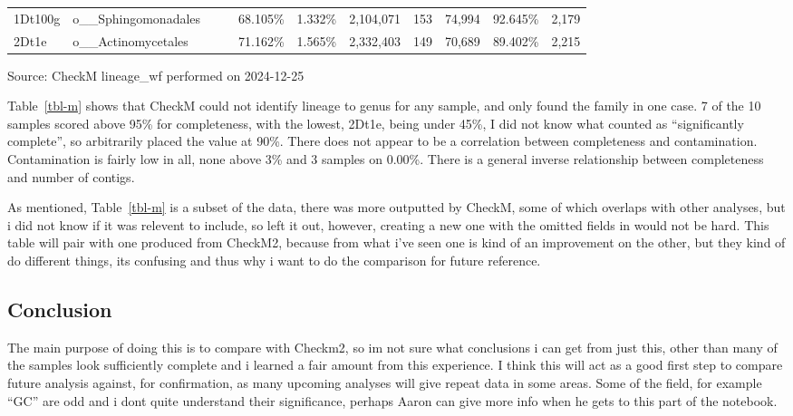 \documentclass[
  letterpaper,
  DIV=11,
  numbers=noendperiod]{scrreprt}
\begin{document}
\begin{table}
{\begin{tabular*}{\linewidth}{@{\extracolsep{\fill}}llrrrrrrrrr}
1Dt100g & o\_\_Sphingomonadales & {\cellcolor[HTML]{808080}{\textcolor[HTML]{FFFFFF}{76.77}}} & {\cellcolor[HTML]{FFF5EB}{\textcolor[HTML]{000000}{0.00}}} & 68.105\% & 1.332\% & 2,104,071 & 153 & 74,994 & 92.645\% & 2,179 \\ 
2Dt1e & o\_\_Actinomycetales & {\cellcolor[HTML]{808080}{\textcolor[HTML]{FFFFFF}{44.74}}} & {\cellcolor[HTML]{FFF5EB}{\textcolor[HTML]{000000}{0.00}}} & 71.162\% & 1.565\% & 2,332,403 & 149 & 70,689 & 89.402\% & 2,215 \\ 
\bottomrule
\end{tabular*}
\begin{minipage}{\linewidth}
Source: CheckM lineage\_wf performed on 2024-12-25\\
\end{minipage}

}

\end{table}%

Table~\ref{tbl-m} shows that CheckM could not identify lineage to genus
for any sample, and only found the family in one case. 7 of the 10
samples scored above 95\% for completeness, with the lowest, 2Dt1e,
being under 45\%, I did not know what counted as ``significantly
complete'', so arbitrarily placed the value at 90\%. There does not
appear to be a correlation between completeness and contamination.
Contamination is fairly low in all, none above 3\% and 3 samples on
0.00\%. There is a general inverse relationship between completeness and
number of contigs.

As mentioned, Table~\ref{tbl-m} is a subset of the data, there was more
outputted by CheckM, some of which overlaps with other analyses, but i
did not know if it was relevent to include, so left it out, however,
creating a new one with the omitted fields in would not be hard. This
table will pair with one produced from CheckM2, because from what i've
seen one is kind of an improvement on the other, but they kind of do
different things, its confusing and thus why i want to do the comparison
for future reference.

\subsection{Conclusion}\label{conclusion}

The main purpose of doing this is to compare with Checkm2, so im not
sure what conclusions i can get from just this, other than many of the
samples look sufficiently complete and i learned a fair amount from this
experience. I think this will act as a good first step to compare future
analysis against, for confirmation, as many upcoming analyses will give
repeat data in some areas. Some of the field, for example ``GC'' are odd
and i dont quite understand their significance, perhaps Aaron can give
more info when he gets to this part of the notebook.
\end{document}
